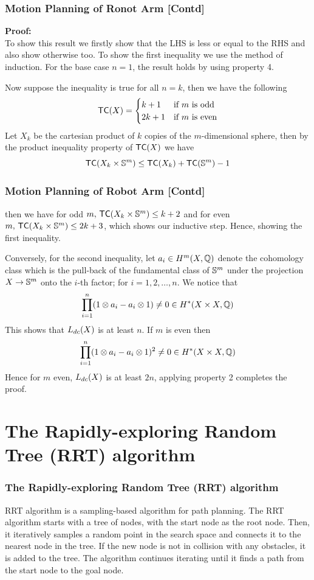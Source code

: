 \documentclass{beamer}
\begin{document}
\begin{frame}
    \frametitle{Motion Planning of Ronot Arm [Contd]}
    \textbf{Proof:}\\
    To show this result we firstly show that the LHS is less or equal to the RHS and also show otherwise too. To show the first inequality we use the method of induction. For the base case $n = 1$, the result holds by using property  4.

    Now suppose the inequality is true for all $n = k$, then we have the following
    \[
        \textsf{TC}(X) = \begin{cases}
            k + 1  & \text{if $m$ is odd}  \\
            2k + 1 & \text{if $m$ is even}
        \end{cases}
    \]
    Let $X_k$ be the cartesian product of $k$ copies of the $m$-dimensional sphere, then by the product inequality property of $\textsf{TC}(X)$ we have
    \[
        \textsf{TC}(X_k \times \mathbb{S}^m) \le \textsf{TC}(X_k) + \textsf{TC}(\mathbb{S}^m) - 1
    \]
\end{frame}

\begin{frame}
    \frametitle{Motion Planning of Robot Arm [Contd]}
    then we have for odd $m,\, \textsf{TC}(X_k \times \mathbb{S}^m) \le k +2$ and for even $m,\, \textsf{TC}(X_k \times \mathbb{S}^m) \le 2k +3$, which shows our inductive step. Hence, showing the first inequality.

    Conversely, for the second inequality, let $a_i \in H^m(X, \mathbb{Q})$ denote the cohomology class which is the pull-back of the fundamental class of $\mathbb{S}^m$ under the projection $X \rightarrow \mathbb{S}^m$ onto the $i$-th factor; for $i = 1, 2, \ldots, n$. We notice that
    \[
        \prod_{i=1}^{n} (1 \otimes a_i - a_i \otimes 1) \neq 0 \in H^*(X \times X, \mathbb{Q})
    \]
    This shows that $L_{dc}(X)$ is at least $n$. If $m$ is even then
    \[
        \prod_{i=1}^{n} (1 \otimes a_i - a_i \otimes 1)^2 \neq 0 \in H^*(X \times X, \mathbb{Q})
    \]
    Hence for $m$ even, $L_{dc}(X)$ is at least $2n$, applying property 2 completes the proof.
\end{frame}

\section{The Rapidly-exploring Random Tree (RRT) algorithm}

\begin{frame}
    \frametitle{The Rapidly-exploring Random Tree (RRT) algorithm}
    RRT algorithm is a sampling-based algorithm for path planning. The RRT algorithm starts with a tree of nodes, with the start node as the root node. Then, it iteratively samples a random point in the search space and connects it to the nearest node in the tree. If the new node is not in collision with any obstacles, it is added to the tree. The algorithm continues iterating until it finds a path from the start node to the goal node.

\end{frame}
\end{document}
